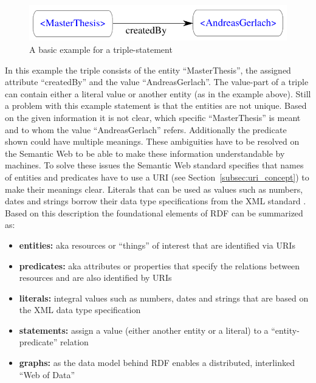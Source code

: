 \begin{figure}[H]
	\centering
		\includegraphics[width=0.8\columnwidth]{images/sample_triple.pdf}
	\caption{A basic example for a triple-statement}
\label{fig:images_semweb_triple}
\end{figure}

In this example the triple consists of the entity ``MasterThesis'', the assigned attribute ``createdBy'' and the value ``AndreasGerlach''. The value-part of a triple can contain either a literal value or another entity (as in the example above). Still a problem with this example statement is that the entities are not unique. Based on the given information it is not clear, which specific ``MasterThesis'' is meant and to whom the value ``AndreasGerlach'' refers. Additionally the predicate shown could have multiple meanings. These ambiguities have to be resolved on the Semantic Web to be able to make these information understandable by machines. To solve these issues the Semantic Web standard specifies that names of entities and predicates have to use a \gls{URI} (see Section~\ref{subsec:uri_concept}) to make their meanings clear. Literals that can be used as values such as numbers, dates and strings borrow their data type specifications from the \gls{XML} standard \citep[pg. 15-38]{wood2014linked}. \\

Based on this description the foundational elements of \gls{RDF} can be summarized as: \@

\begin{itemize}
	\item \textbf{entities:} aka resources or ``things'' of interest that are identified via \gls{URI}s
	\item \textbf{predicates:} aka attributes or properties that specify the relations between resources and are also identified by \gls{URI}s
	\item \textbf{literals:} integral values such as numbers, dates and strings that are based on the \gls{XML} data type specification
	\item \textbf{statements:} assign a value (either another entity or a literal) to a ``entity-predicate'' relation
	\item \textbf{graphs:} as the data model behind \gls{RDF} enables a  distributed, interlinked ``Web of Data''
\end{itemize}

